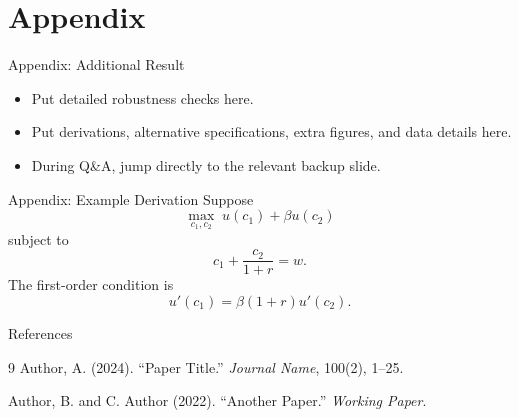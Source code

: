 \documentclass[10pt,aspectratio=169]{beamer}
\begin{document}
\appendix
\section{Appendix}

\begin{frame}{Appendix: Additional Result}
\begin{itemize}
  \item Put detailed robustness checks here.
  \item Put derivations, alternative specifications, extra figures, and data details here.
  \item During Q\&A, jump directly to the relevant backup slide.
\end{itemize}
\end{frame}

\begin{frame}{Appendix: Example Derivation}
Suppose
\[
  \max_{c_1,c_2}\; u(c_1)+\beta u(c_2)
\]
subject to
\[
  c_1 + \frac{c_2}{1+r}=w.
\]
The first-order condition is
\[
  u'(c_1)=\beta(1+r)u'(c_2).
\]
\end{frame}

\begin{frame}{References}
\footnotesize
\begin{thebibliography}{9}
Author, A. (2024). ``Paper Title.'' \textit{Journal Name}, 100(2), 1--25.

Author, B. and C. Author (2022). ``Another Paper.'' \textit{Working Paper}.
\end{thebibliography}
\end{frame}

\end{document}
